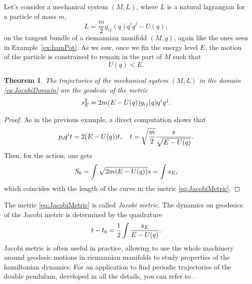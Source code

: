 \documentclass[english,fontsize=11pt,paper=a5,oneside]{scrbook}
\let\d\relax
\DeclareMathOperator{\d}{d}
\newtheorem{theorem}{Theorem}[chapter]
\theoremstyle{definition}
\newenvironment{example}
  {\pushQED{\qed}\renewcommand{\qedsymbol}{$\lozenge$}\examplex}
  {\popQED\endexamplex}
\begin{document}
\begin{example}[Jacobi metric]
    Let's consider a mechanical system $(M,L)$, where $L$ is a natural lagrangian for a particle of mass $m$,
    \begin{equation}
        L = \frac m2 g_{ij}(q) \dot q^i \dot q^j - U(q),
    \end{equation}
    on the tangent bundle of a riemannian manifold $(M,g)$, again like the ones seen in Example~\ref{ex:hamPot}.
    As we saw, once we fix the energy level $E$, the motion of the particle is constrained to remain in the part of $M$ such that
    \begin{equation}\label{eq:JacobiDomain}
        U(q) < E.
    \end{equation}

    \begin{theorem}
        The trajectories of the mechanical system $(M,L)$ in the domain \eqref{eq:JacobiDomain} are the geodesic of the metric
        \begin{equation}\label{eq:JacobiMetric}
            \d s^2_E = 2m (E-U(q)) g_{ij}(q)\d q^i \d q^j.
        \end{equation}
    \end{theorem}
    \begin{proof}
        As in the previous example, a direct computation shows that
        \begin{equation}
            p_i \dot q^i \d t = 2 (E-U(q)) \d t, \quad
            \d t = \sqrt{\frac{m}{2}} \frac{\d s}{\sqrt{E-U(q)}}.
        \end{equation}
        Then, for the action, one gets
        \begin{equation}
            S_0 = \int \sqrt{2m(E-U(q))}\d s = \int \d s_E,
        \end{equation}
        which coincides with the length of the curve in the metric \eqref{eq:JacobiMetric}.
    \end{proof}

    The metric \eqref{eq:JacobiMetric} is called \emph{Jacobi metric}.
    The dynamics on geodesics of the Jacobi metric is determined by the quadrature
    \begin{equation}
        t - t_0 = \frac12 \int \frac{\d s_E}{E-U(q)}.
    \end{equation}
    Jacobi metric is often useful in practice, allowing to use the whole machinery around geodesic motions in riemannian manifolds to study properties of the hamiltonian dynamics.
    For an application to find periodic trajectories of the double pendulum, developed in all the details, you can refer to \cite[Example 8.32]{book:knauf}.
\end{example}
\end{document}
